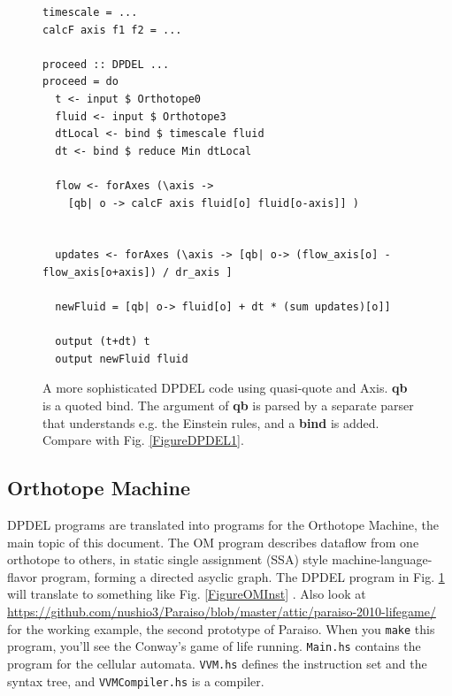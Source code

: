 \documentclass[twocolumn]{article}
\begin{document}
\begin{figure}
\begin{verbatim}
timescale = ...
calcF axis f1 f2 = ...

proceed :: DPDEL ...
proceed = do
  t <- input $ Orthotope0
  fluid <- input $ Orthotope3
  dtLocal <- bind $ timescale fluid
  dt <- bind $ reduce Min dtLocal

  flow <- forAxes (\axis ->
    [qb| o -> calcF axis fluid[o] fluid[o-axis]] )

  
  updates <- forAxes (\axis -> [qb| o-> (flow_axis[o] - flow_axis[o+axis]) / dr_axis ]

  newFluid = [qb| o-> fluid[o] + dt * (sum updates)[o]]

  output (t+dt) t
  output newFluid fluid

\end{verbatim}
\caption{A more sophisticated DPDEL code using quasi-quote and Axis. {\bf qb}
  is a quoted bind. The argument of {\bf qb} is parsed by a separate parser
  that understands e.g. the Einstein rules, and a {\bf bind} is added.
  Compare with Fig. \ref{FigureDPDEL1}.}\label{FigureDPDEL2}
\end{figure}

\subsection{Orthotope Machine}

DPDEL programs are translated into programs for the Orthotope Machine,
the main topic of this document. The OM program describes dataflow
from one orthotope to others, in static single assignment (SSA) style
machine-language-flavor program, forming a directed asyclic graph. The
DPDEL program in Fig. \ref{FigureDPDEL2} will translate to something
like Fig. \ref{FigureOMInst} . Also look at
\url{https://github.com/nushio3/Paraiso/blob/master/attic/paraiso-2010-lifegame/}
for the working example, the second prototype of Paraiso. When you
{\tt make} this program, you'll see the Conway's game of life
running. {\tt Main.hs} contains the program for the cellular
automata. {\tt VVM.hs} defines the instruction set and the syntax
tree, and {\tt VVMCompiler.hs} is a compiler.
\end{document}
